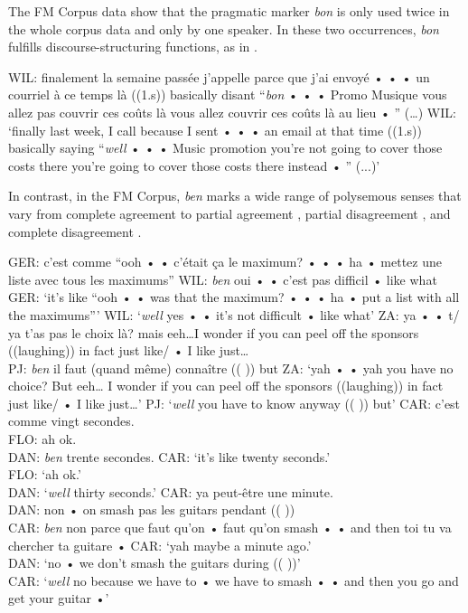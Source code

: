 \documentclass[output=paper]{langscibook}
\begin{document}
The FM Corpus data show that the pragmatic marker \textit{bon} is only used twice in the whole corpus data and only by one speaker. In these two occurrences, \textit{bon} fulfills discourse-structuring functions, as in .

\begin{exe}
    \ex\label{hennecke:ex:34} WIL: finalement la semaine passée j’appelle parce que j’ai envoyé • • • un courriel à ce temps là ((1.s)) basically disant “\textit{bon} • • • Promo Musique vous allez pas couvrir ces coûts là vous allez couvrir ces coûts là au lieu • ” (…)
    \glt WIL: ‘finally last week, I call because I sent • • • an email at that time ((1.s)) basically saying “\textit{well} • • • Music promotion you’re not going to cover those costs there you're going to cover those costs there instead • ” (...)’
\end{exe}


In contrast, in the FM Corpus, \textit{ben} marks a wide range of polysemous senses that vary from complete agreement  to partial agreement , partial disagreement , and complete disagreement .

\begin{exe}
    \ex\label{hennecke:ex:35} GER: c’est comme “ooh • • c’était ça le maximum? • • • ha • mettez une liste avec tous les maximums”
    \glt WIL: \textit{ben} oui • • c’est pas difficil • like what
    \glt GER: ‘it’s like “ooh • • was that the maximum? • • • ha • put a list with all the maximums”’
    \glt WIL: ‘\textit{well} yes • •  it’s not difficult • like what’
    \ex\label{hennecke:ex:36} ZA: ya • • t/ ya t’as pas le choix là? mais eeh…I wonder if you can peel off the sponsors ((laughing)) in fact just like/ • I like just…   \\
    PJ: \textit{ben} il faut (quand même) connaître (( )) but
    \glt ZA: ‘yah • • yah you have no choice? But eeh… I wonder if you can peel off the sponsors ((laughing)) in fact just like/ • I like just…’
     \glt PJ: ‘\textit{well} you have to know anyway (( )) but’
    \ex\label{hennecke:ex:37} CAR: c’est comme vingt secondes. \\
    FLO: ah ok. \\
    DAN: \textit{ben} trente secondes.
    \glt CAR: ‘it’s like twenty seconds.’ \\
    FLO: ‘ah ok.’ \\
    DAN: ‘\textit{well} thirty seconds.’
    \ex\label{hennecke:ex:38} CAR: ya peut-être une minute. \\
    DAN: non • on smash pas les guitars pendant (( )) \\
    CAR: \textit{ben} non parce que faut qu’on • faut qu’on smash • • and then toi tu va chercher ta guitare •
    \glt CAR: ‘yah maybe a minute ago.’ \\
    DAN: ‘no • we don't smash the guitars during (( ))’ \\
    CAR:  ‘\textit{well} no because we have to •  we have to smash • • and then you go and get your guitar •'
\end{exe}
\end{document}
